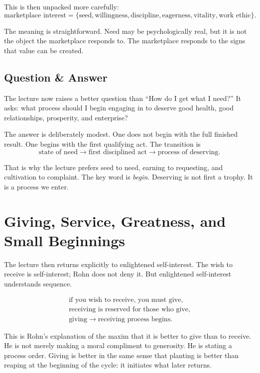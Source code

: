 This is then unpacked more carefully:
\begin{equation}
\text{marketplace interest}
=
\{\text{seed},\text{willingness},\text{discipline},\text{eagerness},\text{vitality},\text{work ethic}\}.
\end{equation}

The meaning is straightforward. Need may be psychologically real, but it is not the object the marketplace responds to. The marketplace responds to the signs that value can be created.

\subsection{Question \& Answer}

The lecture now raises a better question than ``How do I get what I need?'' It asks: what process should I begin engaging in to deserve good health, good relationships, prosperity, and enterprise?

The answer is deliberately modest. One does not begin with the full finished result. One begins with the first qualifying act. The transition is
\begin{equation}
\text{state of need} \rightarrow \text{first disciplined act} \rightarrow \text{process of deserving}.
\end{equation}

That is why the lecture prefers seed to need, earning to requesting, and cultivation to complaint. The key word is \emph{begin}. Deserving is not first a trophy. It is a process we enter.

\section{Giving, Service, Greatness, and Small Beginnings}

The lecture then returns explicitly to enlightened self-interest. The wish to receive is self-interest; Rohn does not deny it. But enlightened self-interest understands sequence.

\begin{align}
\text{if you wish to receive, you must give}, \\
\text{receiving is reserved for those who give}, \\
\text{giving} \rightarrow \text{receiving process begins}.
\end{align}

This is Rohn's explanation of the maxim that it is better to give than to receive. He is not merely making a moral compliment to generosity. He is stating a process order. Giving is better in the same sense that planting is better than reaping at the beginning of the cycle: it initiates what later returns.

